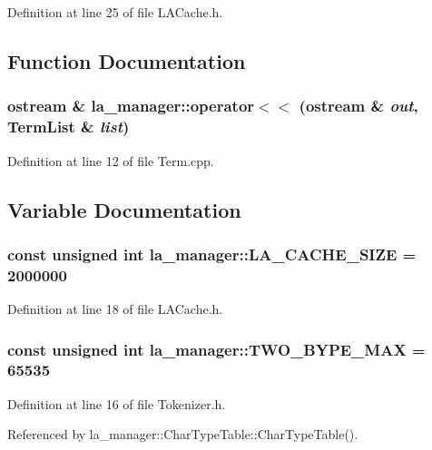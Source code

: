 Definition at line 25 of file LACache.h.

\subsection{Function Documentation}
\hypertarget{namespacela__manager_85370bde9cbbf78fdda59928e482fb4b}{
\subsubsection[{operator$<$$<$}]{\setlength{\rightskip}{0pt plus 5cm}ostream \& la\_\-manager::operator$<$$<$ (ostream \& {\em out}, \/  TermList \& {\em list})}}
\label{namespacela__manager_85370bde9cbbf78fdda59928e482fb4b}




Definition at line 12 of file Term.cpp.

\subsection{Variable Documentation}
\hypertarget{namespacela__manager_a750d488a0f8a7f20ba3a0adf64b44c4}{
\subsubsection[{LA\_\-CACHE\_\-SIZE}]{\setlength{\rightskip}{0pt plus 5cm}const unsigned int {\bf la\_\-manager::LA\_\-CACHE\_\-SIZE} = 2000000}}
\label{namespacela__manager_a750d488a0f8a7f20ba3a0adf64b44c4}




Definition at line 18 of file LACache.h.\hypertarget{namespacela__manager_209bf4bd6bbc83558619fa8b8f6dc451}{
\subsubsection[{TWO\_\-BYPE\_\-MAX}]{\setlength{\rightskip}{0pt plus 5cm}const unsigned int {\bf la\_\-manager::TWO\_\-BYPE\_\-MAX} = 65535}}
\label{namespacela__manager_209bf4bd6bbc83558619fa8b8f6dc451}




Definition at line 16 of file Tokenizer.h.

Referenced by la\_\-manager::CharTypeTable::CharTypeTable().